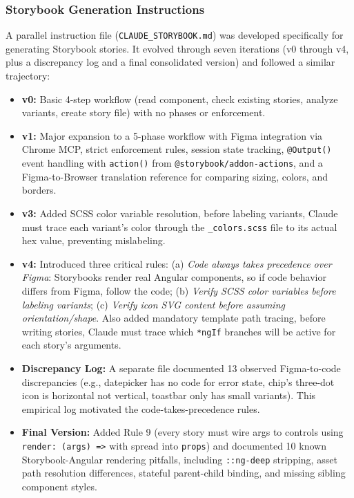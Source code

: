 \subsubsection{Storybook Generation Instructions}

A parallel instruction file (\texttt{CLAUDE\_STORYBOOK.md}) was developed specifically for generating Storybook stories. It evolved through seven iterations (v0 through v4, plus a discrepancy log and a final consolidated version) and followed a similar trajectory:

\begin{itemize}
    \item \textbf{v0:} Basic 4-step workflow (read component, check existing stories, analyze variants, create story file) with no phases or enforcement.
    \item \textbf{v1:} Major expansion to a 5-phase workflow with Figma integration via Chrome MCP, strict enforcement rules, session state tracking, \texttt{@Output()} event handling with \texttt{action()} from \texttt{@storybook/addon-actions}, and a Figma-to-Browser translation reference for comparing sizing, colors, and borders.
    \item \textbf{v3:} Added SCSS color variable resolution, before labeling variants, Claude must trace each variant's color through the \texttt{\_colors.scss} file to its actual hex value, preventing mislabeling.
    \item \textbf{v4:} Introduced three critical rules: (a) \textit{Code always takes precedence over Figma}: Storybooks render real Angular components, so if code behavior differs from Figma, follow the code; (b) \textit{Verify SCSS color variables before labeling variants}; (c) \textit{Verify icon SVG content before assuming orientation/shape}. Also added mandatory template path tracing, before writing stories, Claude must trace which \texttt{*ngIf} branches will be active for each story's arguments.
    \item \textbf{Discrepancy Log:} A separate file documented 13 observed Figma-to-code discrepancies (e.g., datepicker has no code for error state, chip's three-dot icon is horizontal not vertical, toastbar only has small variants). This empirical log motivated the code-takes-precedence rules.
    \item \textbf{Final Version:} Added Rule 9 (every story must wire args to controls using \texttt{render: (args) =>} with spread into \texttt{props}) and documented 10 known Storybook-Angular rendering pitfalls, including \texttt{::ng-deep} stripping, asset path resolution differences, stateful parent-child binding, and missing sibling component styles.
\end{itemize}

